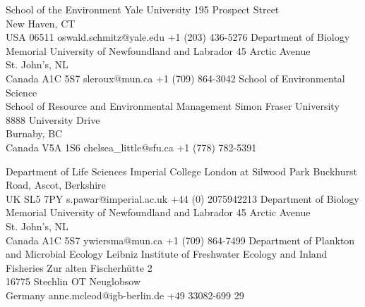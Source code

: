 

\cvdoublecolumn
{
  {School of the Environment}
  {Yale University}
  {195 Prospect Street\\
  New Haven, CT\\
  USA 06511}
  {oswald.schmitz@yale.edu}
  {+1 (203) 436-5276}
}
{
  {Department of Biology}
  {Memorial University of Newfoundland and Labrador}
  {45 Arctic Avenue\\
  St. John's, NL\\
  Canada A1C 5S7}
  {sleroux@mun.ca}
  {+1 (709) 864-3042}
}
{
  {School of Environmental Science \\ 
  School of Resource and Environmental Management}
  {Simon Fraser University}
  {8888 University Drive\\
  Burnaby, BC\\
  Canada V5A 1S6}
  {chelsea\_little@sfu.ca}
  {+1 (778) 782-5391}
}

\cvdoublecolumn
{
  {Department of Life Sciences}
  {Imperial College London at Silwood Park}
  {Buckhurst Road, Ascot, Berkshire\\
  UK SL5 7PY}
  {s.pawar@imperial.ac.uk}
  {+44 (0) 2075942213}
}
{
  {Department of Biology}
  {Memorial University of Newfoundland and Labrador}
  {45 Arctic Avenue\\
  St. John's, NL\\
  Canada A1C 5S7}
  {ywiersma@mun.ca}
  {+1 (709) 864-7499}
}
{
  {Department of Plankton and Microbial Ecology}
  {Leibniz Institute of Freshwater Ecology and Inland Fisheries}
  {Zur alten Fischerhütte 2\\
  16775 Stechlin OT Neuglobsow\\
  Germany}
  {anne.mcleod@igb-berlin.de}
  {+49 33082-699 29}
}